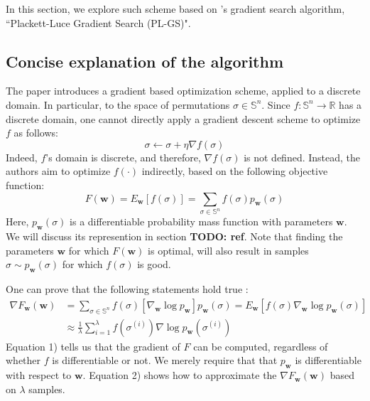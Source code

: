 \documentclass[a4paper,10pt]{article}
\begin{document}
	In this section, we explore such scheme based on \citeauthor{santucci_gradient_2020}'s gradient search algorithm, ``Plackett-Luce Gradient Search (PL-GS)".
	
	\subsection{Concise explanation of the algorithm}
	The paper introduces a gradient based optimization scheme, applied to a discrete domain. In particular, to the space of permutations $\sigma \in \mathbb{S}^n$. 
	Since $f : \mathbb{S}^n \rightarrow \mathbb{R}$ has a discrete domain, one cannot directly apply a gradient descent scheme to optimize $f$ as follows:
	$$
	\sigma \leftarrow \sigma + \eta \nabla f(\sigma)
	$$
	Indeed, $f$'s domain is discrete, and therefore, $\nabla f(\sigma)$ is not defined. Instead, the authors aim to optimize $f(\cdot)$ indirectly, based on the following objective function:
	$$F(\mathbf{w}) = E_\mathbf{w}[f(\sigma)] = \sum_{\sigma \in \mathbb{S}^n} f(\sigma) p_\mathbf{w}(\sigma)$$
	Here, $p_\mathbf{w}(\sigma)$ is a differentiable probability mass function with parameters $\mathbf{w}$. We will discuss its represention in section \textbf{TODO: ref}. Note that finding the parameters $\mathbf{w}$ for which $F(\mathbf{w})$ is optimal, will also result in samples $\sigma \sim p_\mathbf{w}(\sigma)$ for which $f(\sigma)$ is good.
	
	One can prove that the following statements hold true \citep{santucci_gradient_2020}:
	\begin{align}
	\nabla F_\mathbf{w}(\mathbf{w}) & = \sum_{\sigma \in \mathbb{S}^n} f(\sigma) \left[ \nabla_\mathbf{w} \log p_\mathbf{w}\right] p_\mathbf{w}(\sigma) = E_\mathbf{w} \left[f(\sigma) \nabla_\mathbf{w} \log p_\mathbf{w}(\sigma) \right] \\
									& \approx \frac{1}{\lambda} \sum_{i=1}^{\lambda} f(\sigma^{(i)}) \nabla \log p_\mathbf{w}(\sigma^{(i)})
	\end{align}
	Equation 1) tells us that the gradient of $F$ can be computed, regardless of whether $f$ is differentiable or not. We merely require that that $p_\mathbf{w}$ is differentiable with respect to $\mathbf{w}$. Equation 2) shows how to approximate the $\nabla F_\mathbf{w}(\mathbf{w})$ based on $\lambda$ samples.
	
	
	
\end{document}
